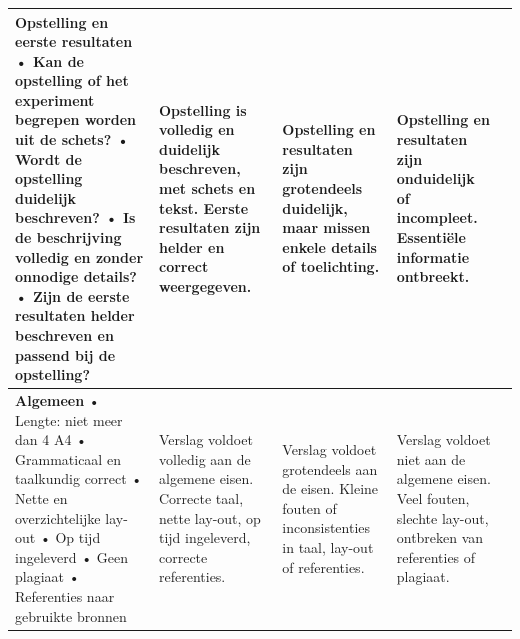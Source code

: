 \documentclass{article}
\begin{document}
\begin{landscape}
\begin{longtable}{p{7cm}|p{5cm}|p{5cm}|p{5cm}|p{1cm}}
\textbf{Opstelling en eerste resultaten} \newline
• Kan de opstelling of het experiment begrepen worden uit de schets? \newline
• Wordt de opstelling duidelijk beschreven? \newline
• Is de beschrijving volledig en zonder onnodige details? \newline
• Zijn de eerste resultaten helder beschreven en passend bij de opstelling? \newline
&
Opstelling is volledig en duidelijk beschreven, met schets en tekst. Eerste resultaten zijn helder en correct weergegeven. 
&
Opstelling en resultaten zijn grotendeels duidelijk, maar missen enkele details of toelichting.
&
Opstelling en resultaten zijn onduidelijk of incompleet. Essentiële informatie ontbreekt.
& \\
\hline

\textbf{Algemeen} \newline
• Lengte: niet meer dan 4 A4 \newline
• Grammaticaal en taalkundig correct \newline
• Nette en overzichtelijke lay-out \newline
• Op tijd ingeleverd \newline
• Geen plagiaat \newline
• Referenties naar gebruikte bronnen
&
Verslag voldoet volledig aan de algemene eisen. Correcte taal, nette lay-out, op tijd ingeleverd, correcte referenties.
&
Verslag voldoet grotendeels aan de eisen. Kleine fouten of inconsistenties in taal, lay-out of referenties.
&
Verslag voldoet niet aan de algemene eisen. Veel fouten, slechte lay-out, ontbreken van referenties of plagiaat.
& \\

\end{longtable}

\end{landscape}
\end{document}
